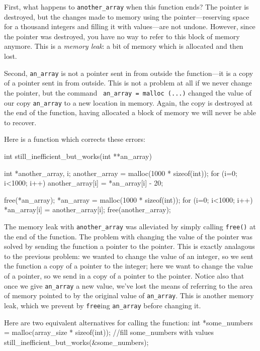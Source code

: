 \documentclass[12pt]{article}
\begin{document}
First, what happens to {\tt another\_array} when this function
ends? The pointer is destroyed, but the changes made to memory using
the pointer---reserving space for a thousand integers and filling it
with values---are not undone. However, since the pointer was destroyed,
you have no way to refer to this block of memory anymore.  This is a
{\sl memory leak}: a bit of memory which is allocated and then lost.

Second, {\tt an\_array} is not a pointer sent in from outside the
function---it is a copy of a pointer sent in from outside. This is not
a problem at all if we never change the pointer, but the command {\tt
an\_array = malloc (...)} changed the value of our copy {\tt an\_array}
to a new location in memory.  Again, the copy is destroyed at the end
of the function, having allocated a block of memory we will never be
able to recover.

Here is a function which corrects these errors:

int still_inefficient_but_works(int **an_array){
    int *another_array, i;
    another_array = malloc(1000 * sizeof(int));
    for (i=0; i<1000; i++)
        another_array[i] = *an_array[i] - 20;

    free(*an_array);
    *an_array = malloc(1000 * sizeof(int));
    for (i=0; i<1000; i++)
        *an_array[i] = another_array[i];
    free(another_array);
}

The memory leak with {\tt another\_array} was alleviated by simply calling {\tt free()} at the end of the
function. The problem with changing the value of the pointer was solved by sending the function a pointer
to the pointer. This is exactly analagous to the previous problem: we wanted to change the value of an
integer, so we sent the function a copy of a pointer to the integer; here we want to change the value of a
pointer, so we send in a copy of a pointer to the pointer. Notice also that once we give {\tt *an\_array}
a new value, we've lost the means of referring to the area of memory pointed to by the original value of
{\tt *an\_array}. This is another memory leak, which we prevent by {\tt free}ing {\tt *an\_array} before
changing it.

Here are two equivalent alternatives for calling the function:
int *some_numbers = malloc(array_size * sizeof(int));
//fill some_numbers with values
still_inefficient_but_works(&some_numbers);
\end{document}
